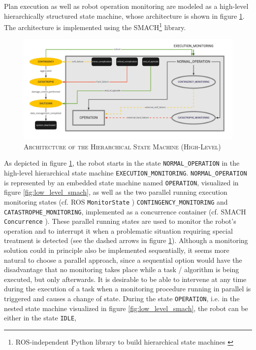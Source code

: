\documentclass[english, master, utf8]{base/thesis_KBS}
\newcommand{\code}[1]{\colorbox{light-gray}{\texttt{#1}}}
\begin{document}
Plan execution as well as robot operation monitoring are modeled as a high-level hierarchically structured state machine, whose architecture is shown
in figure \ref{fig:high_level_smach}. The architecture is implemented using the SMACH\footnote{ROS-independent Python library to build hierarchical state machines \cite{smach}} 
library.
\begin{figure}[H]
    \centering
    \includegraphics[width=\textwidth]{pics/SMACH_high_level_pretty.jpg}
    \caption{\textsc{Architecture of the Hierarchical State Machine (High-Level)}}
    \label{fig:high_level_smach}
\end{figure}
\noindent
As depicted in figure \ref{fig:high_level_smach}, the robot starts in the state \code{NORMAL\_OPERATION} in the high-level hierarchical state machine \code{EXECUTION\_MONITORING}.
\code{NORMAL\_OPERATION} is represented by an embedded state machine named \code{OPERATION}, visualized in figure \ref{fig:low_level_smach}, as well as the two
parallel running execution monitoring states (cf. ROS \code{MonitorState} \cite{monitor_state}) \code{CONTINGENCY\_MONITORING} and \code{CATASTROPHE\_MONITORING}, 
implemented as a concurrence container (cf. SMACH \code{Concurrence} \cite{concurrence_container}).
These parallel running states are used to monitor the robot's operation and to interrupt it when a problematic situation requiring special treatment is detected
(see the dashed arrows in figure \ref{fig:high_level_smach}).
Although a monitoring solution could in principle also be implemented sequentially, it seems more natural to choose a parallel approach, since a sequential option
would have the disadvantage that no monitoring takes place while a task / algorithm is being executed, but only afterwards.
It is desirable to be able to intervene at any time during the execution of a task when a monitoring procedure running in parallel is triggered and causes a change of state.
During the state \code{OPERATION}, i.e. in the nested state machine visualized in figure \ref{fig:low_level_smach}, the robot can be either in the state \code{IDLE}, 
\end{document}
